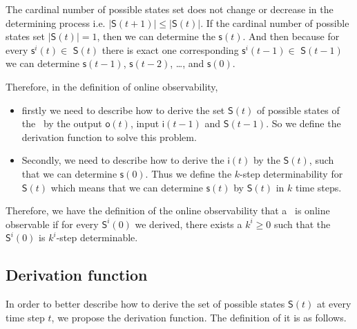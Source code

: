  The cardinal number of possible states set does not change or decrease in the determining process i.e. $|\mathsf{S}(t+1)|\le|\mathsf{S}(t)|$. %
 If the cardinal number of possible states set $|\mathsf{S}(t)|=1$, then we can determine the $\mathsf{s}(t)$. And then because for every $\mathsf{s}^{i}(t)\in $ $\mathsf{S}(t)$ there is exact one corresponding $\mathsf{s}^{i}(t-1)\in $ $\mathsf{S}(t-1)$ we can determine $\mathsf{s}(t-1)$, $\mathsf{s}(t-2)$, \ldots, and $\mathsf{s}(0)$.

Therefore, in the definition of online observability, 
\begin{itemize}
\item firstly we need to describe how to derive the set $\mathsf{S}(t)$ of possible states of the \BCN\ by the output $\mathsf{o}(t)$, input $\mathsf{i}(t-1)$ and $\mathsf{S}(t-1)$. So we define the derivation function to solve this problem.
\item  Secondly, we need to describe how to derive the $\mathsf{i}(t)$ by the $\mathsf{S}(t)$, such that we can determine $\mathsf{s}(0)$. Thus we define the $k$-step determinability for $\mathsf{S}(t)$ which means that we can determine $\mathsf{s}(t)$ by $\mathsf{S}(t)$ in $k$ time steps.
\end{itemize} 

Therefore, we have the definition of the online observability that a \BCN\ is online observable if for every $\mathsf{S}^{i}(0)$ we derived, there exists a $k^i\ge 0$ such that the $\mathsf{S}^{i}(0)$ is $k^i$-step determinable.


\subsection{Derivation function}

In order to better describe how to derive the set of possible states $\mathsf{S}(t)$ at every time step $t$, we propose the derivation function. The definition of it is as follows.

